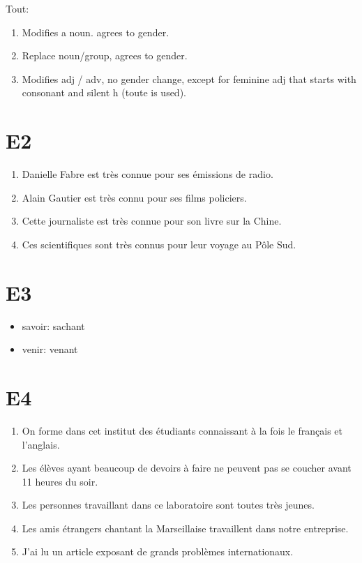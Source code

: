 \documentclass{book}
\begin{document}
    Tout:
    \begin{enumerate}
        \item Modifies a noun. agrees to gender.
        \item Replace noun/group, agrees to gender.
        \item Modifies adj / adv, no gender change, except for feminine adj that starts with consonant and silent h (toute is used).
    \end{enumerate}

    \section{E2}
        \begin{enumerate}
            \item Danielle Fabre est très connue pour ses émissions de radio.
            \item Alain Gautier est très connu pour ses films policiers.
            \item Cette journaliste est très connue pour son livre sur la Chine.
            \item Ces scientifiques sont très connus pour leur voyage au Pôle Sud.
        \end{enumerate}

    \section{E3}
        \begin{itemize}
            \item savoir: sachant
            \item venir: venant
        \end{itemize}

    \section{E4}
        \begin{enumerate}
            \item On forme dans cet institut des étudiants connaissant à la fois le français et l'anglais.
            \item Les élèves ayant beaucoup de devoirs à faire ne peuvent pas se coucher avant 11 heures du soir.
            \item Les personnes travaillant dans ce laboratoire sont toutes très jeunes.
            \item Les amis étrangers chantant la Marseillaise travaillent dans notre entreprise.
            \item J'ai lu un article exposant de grands problèmes internationaux.
        \end{enumerate}
\end{document}
